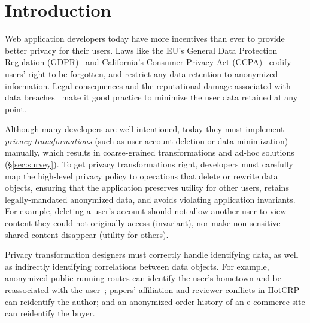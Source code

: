 \section{Introduction}
Web application developers today have more incentives than ever to provide better privacy for their
users.
%
Laws like the EU's General Data Protection Regulation (GDPR)~\cite{eu:gdpr} and California's
Consumer Privacy Act (CCPA)~\cite{ca:privacy-act} codify users' right to be forgotten, and restrict
any data retention to anonymized information.
%
Legal consequences and the reputational damage associated with data breaches~\cite{breach:amazon,
breach:twitter, breach:fb, breach:marriott, breach:quora} make it good practice to minimize the user
data retained at any point.
%

%
Although many developers are well-intentioned, today they must implement \emph{privacy
transformations} (such as user account deletion or data minimization) manually, which results in
coarse-grained transformations and ad-hoc solutions (\S\ref{sec:survey}).
%
To get privacy transformations right, developers must carefully map the high-level privacy
policy to operations that delete or rewrite data objects, ensuring that the application preserves
utility for other users, retains legally-mandated anonymized data, and avoids violating
application invariants.
%
For example, deleting a user's account should not allow another user to view content they could
not originally access (invariant), nor make non-sensitive shared content disappear (utility for
others).
%

%
Privacy transformation designers must correctly handle identifying data, as well as indirectly identifying
correlations between data objects.
%
For example, anonymized public running routes can identify the user's hometown and be
reassociated with the user~\cite{strava:heatmap};
papers' affiliation and reviewer conflicts in HotCRP can reidentify the author; and an anonymized
order history of an e-commerce site can reidentify the buyer.
%

